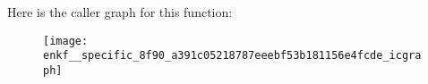 Here is the caller graph for this function\-:\nopagebreak
\begin{figure}[H]
\begin{center}
\leavevmode
\texttt{[image: enkf\_\_specific\_8f90\_a391c05218787eeebf53b181156e4fcde\_icgraph]}
\end{center}
\end{figure}


